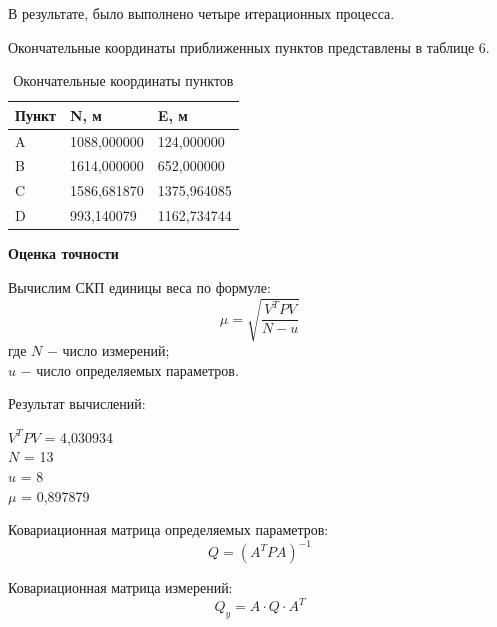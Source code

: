 \documentclass[a4paper]{article}
\begin{document}
\large{ В результате, было выполнено четыре итерационных процесса. 
\par Окончательные координаты приближенных пунктов представлены в таблице 6.
\begin{table}[h]
    \centering
    \caption{Окончательные координаты пунктов}
    \begin{tabular}{|p{3.5cm}|p{3.0cm}|p{3.0cm}|}
    \hline
        Пункт & N, м & E, м\\
        \hline
        A & 1088,000000 & 124,000000\\
        \hline
        B & 1614,000000 & 652,000000\\
        \hline
        C & 1586,681870 & 1375,964085\\
        \hline
        D & 993,140079 & 1162,734744\\
        \hline
    \end{tabular}
\end{table}

\newpage

\begin{center}
    \Large{\textbf{Оценка точности}}
\end{center}

\par Вычислим СКП единицы веса по формуле:
    \begin{equation}
        \mu = \sqrt{\frac{V^TPV}{N - u}}
    \end{equation}
где $N$ $-$ число измерений;\\
$u$ $-$ число определяемых параметров.
\par Результат вычислений:

\begin{center}
    $V^{T}PV$ = 4,030934\\
    $N$ = 13\\
    $u$ = 8\\
    $\mu$ = 0,897879
\end{center}

\par Ковариационная матрица определяемых параметров:
    \begin{equation}
        Q = \left( A^TPA \right)^{-1}
    \end{equation}
\par Ковариационная матрица измерений:
\begin{equation}
  Q_y = A \cdot Q \cdot A^T  
\end{equation}
}
\end{document}
